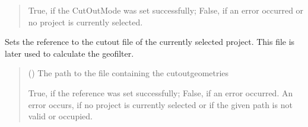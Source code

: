 \documentclass[letterpaper,10pt,english]{sphinxmanual}
\begin{document}
\begin{fulllineitems}
\begin{fulllineitems}
\begin{quote}
\begin{description}
\sphinxAtStartPar
True, if the CutOutMode was set successfully; False, if an error occurred or no project is currently selected.

\sphinxAtStartPar
{}

\end{description}\end{quote}

\end{fulllineitems}


\begin{fulllineitems}
\label{\detokenize{apidoc/src.osm_configurator.control:src.osm_configurator.control.control_interface.IControl.set_cut_out_reference}}
\pysigstartsignatures
{}
\pysigstopsignatures
\sphinxAtStartPar
Sets the reference to the cut\sphinxhyphen{}out file of the currently selected project.
This file is later used to calculate the geofilter.
\begin{quote}\begin{description}
\sphinxAtStartPar
{} () \textendash{} The path to the file containing the cut\sphinxhyphen{}out\sphinxhyphen{}geometries

\sphinxAtStartPar
True, if the reference was set successfully; False, if an error occurred. An error occurs, if no project is currently selected or if the given path is not valid or occupied.

\sphinxAtStartPar
{}

\end{description}\end{quote}

\end{fulllineitems}



\end{fulllineitems}
\end{document}
